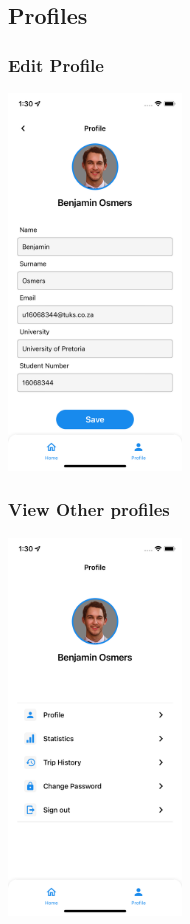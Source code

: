 \documentclass[hidelinks, 12pt, a4paper]{article}
\begin{document}
\subsection{Profiles}
\subsubsection{Edit Profile}
\begin{center}
  \includegraphics[height=10cm]{images/edit_profile.png}
\end{center}
\subsubsection{View Other profiles}
\begin{center}
  \includegraphics[height=10cm]{images/view_profile.png}
\end{center}
\vspace{1cm}
\end{document}
